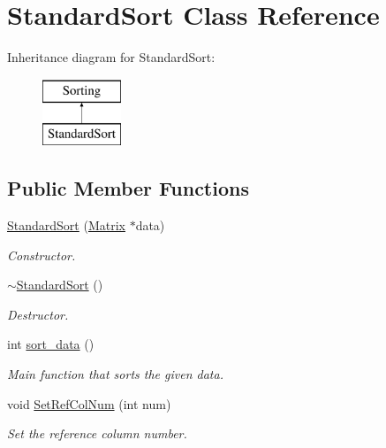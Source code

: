 \hypertarget{classStandardSort}{
\section{StandardSort Class Reference}
\label{d0/d94/classStandardSort}
}
Inheritance diagram for StandardSort:\begin{figure}[H]
\begin{center}
\leavevmode
\includegraphics[height=2cm]{d0/d94/classStandardSort}
\end{center}
\end{figure}
\subsection*{Public Member Functions}
\begin{DoxyCompactItemize}
\item 
\hyperlink{classStandardSort_afecdf65f1388c1d23339c99f799131fd}{StandardSort} (\hyperlink{classMatrix}{Matrix} $\ast$data)
\begin{DoxyCompactList}\small\item\em Constructor. \item\end{DoxyCompactList}\item 
\hypertarget{classStandardSort_a71e4c8dff2b71dcf0958babaf2e3beb8}{
\hyperlink{classStandardSort_a71e4c8dff2b71dcf0958babaf2e3beb8}{$\sim$StandardSort} ()}
\label{d0/d94/classStandardSort_a71e4c8dff2b71dcf0958babaf2e3beb8}

\begin{DoxyCompactList}\small\item\em Destructor. \item\end{DoxyCompactList}\item 
int \hyperlink{classStandardSort_ae0c7e47ba48c319989b41815b0724f41}{sort\_\-data} ()
\begin{DoxyCompactList}\small\item\em Main function that sorts the given data. \item\end{DoxyCompactList}\item 
\hypertarget{classStandardSort_afdf7549b717b75c6274697fddcb75c8a}{
void \hyperlink{classStandardSort_afdf7549b717b75c6274697fddcb75c8a}{SetRefColNum} (int num)}
\label{d0/d94/classStandardSort_afdf7549b717b75c6274697fddcb75c8a}

\begin{DoxyCompactList}\small\item\em Set the reference column number. \item\end{DoxyCompactList}\end{DoxyCompactItemize}


